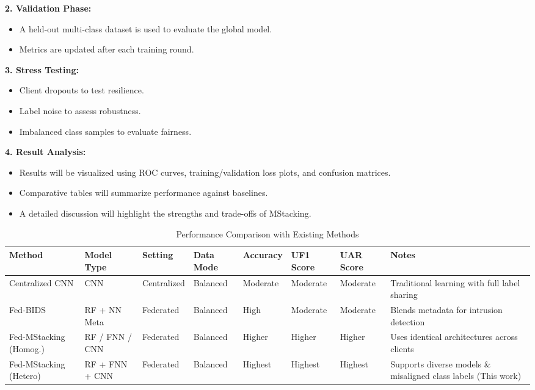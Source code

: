 \textbf{2. Validation Phase:}
\begin{itemize}
    \item A held-out multi-class dataset is used to evaluate the global model.
    \item Metrics are updated after each training round.
\end{itemize}

\textbf{3. Stress Testing:}
\begin{itemize}
    \item Client dropouts to test resilience.
    \item Label noise to assess robustness.
    \item Imbalanced class samples to evaluate fairness.
\end{itemize}

\textbf{4. Result Analysis:}
\begin{itemize}
    \item Results will be visualized using ROC curves, training/validation loss plots, and confusion matrices.
    \item Comparative tables will summarize performance against baselines.
    \item A detailed discussion will highlight the strengths and trade-offs of MStacking.
\end{itemize}

\begin{table}[h]
\centering
\caption{Performance Comparison with Existing Methods}
\label{tab:performance_comparison}
\renewcommand{\arraystretch}{1.2}
\begin{tabular}{|p{2cm}|p{1cm}|p{1.5cm}|p{1.5cm}|p{1.5cm}|p{1.5cm}|p{2cm}|p{2cm}|}
\hline
\textbf{Method} & \textbf{Model Type} & \textbf{Setting} & \textbf{Data Mode} & \textbf{Accuracy} & \textbf{UF1 Score} & \textbf{UAR Score} & \textbf{Notes} \\ \hline
Centralized CNN & CNN & Centralized & Balanced & Moderate & Moderate & Moderate & Traditional learning with full label sharing \\ \hline
Fed-BIDS~\cite{fedbids2022} & RF + NN Meta & Federated & Balanced & High & Moderate & Moderate & Blends metadata for intrusion detection \\ \hline
Fed-MStacking (Homog.) & RF / FNN / CNN & Federated & Balanced & Higher & Higher & Higher & Uses identical architectures across clients \\ \hline
Fed-MStacking (Hetero) & RF + FNN + CNN & Federated & Balanced & Highest & Highest & Highest & Supports diverse models \& misaligned class labels (This work) \\ \hline
\end{tabular}
\end{table}
